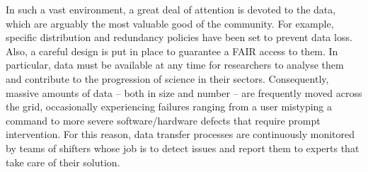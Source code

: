 In such a vast environment, a great deal of attention is devoted to the data, which are arguably the most valuable good of the community.
For example, specific distribution and redundancy policies have been set to prevent data loss. Also, a careful design is put in place to guarantee a FAIR access to them.
In particular, data must be available at any time for researchers to analyse them and contribute to the progression of science in their sectors.
Consequently, massive amounts of data -- both in size and number -- are frequently moved across the grid, occasionally experiencing failures ranging from a user mistyping a command to more severe software/hardware defects that require prompt intervention. 
For this reason, data transfer processes are continuously monitored by teams of shifters whose job is to detect issues and report them to experts that take care of their solution.

